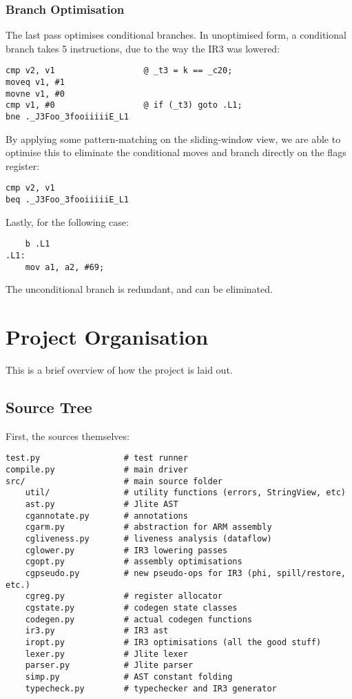 \documentclass[12pt]{article}
\begin{document}
\subsubsection{Branch Optimisation}

The last pass optimises conditional branches. In unoptimised form, a conditional branch takes 5 instructions, due to the
way the IR3 was lowered:

\begin{verbatim}
cmp v2, v1                  @ _t3 = k == _c20;
moveq v1, #1
movne v1, #0
cmp v1, #0                  @ if (_t3) goto .L1;
bne ._J3Foo_3fooiiiiiE_L1
\end{verbatim}

By applying some pattern-matching on the sliding-window view, we are able to optimise this to eliminate the conditional
moves and branch directly on the flags register:

\begin{verbatim}
cmp v2, v1
beq ._J3Foo_3fooiiiiiE_L1
\end{verbatim}


Lastly, for the following case:

\begin{verbatim}
	b .L1
.L1:
	mov a1, a2, #69;
\end{verbatim}

The unconditional branch is redundant, and can be eliminated.




\section{Project Organisation}

This is a brief overview of how the project is laid out.

\subsection{Source Tree}

First, the sources themselves:

\begin{verbatim}
test.py                 # test runner
compile.py              # main driver
src/                    # main source folder
	util/               # utility functions (errors, StringView, etc)
	ast.py              # Jlite AST
	cgannotate.py       # annotations
	cgarm.py            # abstraction for ARM assembly
	cgliveness.py       # liveness analysis (dataflow)
	cglower.py          # IR3 lowering passes
	cgopt.py            # assembly optimisations
	cgpseudo.py         # new pseudo-ops for IR3 (phi, spill/restore, etc.)
	cgreg.py            # register allocator
	cgstate.py          # codegen state classes
	codegen.py          # actual codegen functions
	ir3.py              # IR3 ast
	iropt.py            # IR3 optimisations (all the good stuff)
	lexer.py            # Jlite lexer
	parser.py           # Jlite parser
	simp.py             # AST constant folding
	typecheck.py        # typechecker and IR3 generator
\end{verbatim}
\end{document}
